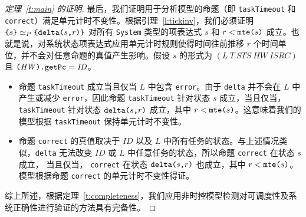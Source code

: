 \begin{proof}[定理~\ref{t:main} 的证明]
最后，我们证明用于分析模型的命题（即 \verb|taskTimeout| 和 \verb|correct|）满足单元计时不变性。根据引理~\ref{l:tickinv}，我们必须证明 
$\verb|{|s\verb|}|\simeq_P\verb|{|\deltaS{s}{r}\verb|}|$ 对所有 \verb|System| 类型的项表达式 $s$ 和 $r<\texttt{mte(}s\texttt{)}$ 成立。也就是说，对系统状态项表达式应用单元计时规则使得时间往前推移 $r$ 个时间单位，并不会对任意命题的真值产生影响。假设 $s$ 的形式为 $(L~T~\mathit{STS}~\mathit{HW}~\mathit{ISRC})$ 且 $\verb|(|\mathit{HW}\verb|).getPc|=\mathit{ID}$。
\begin{itemize}
\item 
命题 \verb|taskTimeout| 成立当且仅当 $L$ 中包含 \verb|error|。由于 \verb|delta| 并不会在 $L$ 中产生或减少 \verb|error|，因此命题 \verb|taskTimeout| 针对状态 $s$ 成立，当且仅当， \verb|taskTimeout| 针对状态 $\texttt{delta(}s\texttt{,}r\texttt{)}$ 成立，其中 $r<\texttt{mte(}s\texttt{)}$。这意味着我们的模型根据 \verb|taskTimeout| 保持单元计时不变性。
\item 
命题 \verb|correct| 的真值取决于 $\mathit{ID}$ 以及 $L$ 中所有任务的状态。与上述情况类似，\verb|delta| 无法改变 $\mathit{ID}$ 或 $L$ 中任意任务的状态，所以命题 \verb|correct| 在状态 $s$ 成立， 当且仅当， \verb|correct| 在状态 $\texttt{delta(}s\texttt{,}r\texttt{)}$ 也成立，其中 $r<\texttt{mte(}s\texttt{)}$。模型根据命题 \verb|correct| 的单元计时不变性得证。
\end{itemize}

综上所述，根据定理~\ref{t:completeness}，我们应用非时控模型检测对可调度性及系统正确性进行验证的方法具有完备性。
\end{proof}
